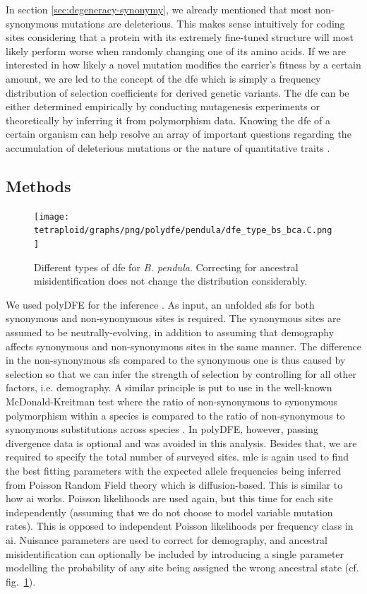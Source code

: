 \documentclass[hidelinks,11pt]{article}
\newcommand{\dadi}{\textdelta a\textdelta i}
\newcommand{\pendula}{\textit{B. pendula}}
\begin{document}
    In section \ref{sec:degeneracy-synonymy}, we already mentioned that most non-synonymous mutations are deleterious. This makes sense intuitively for coding sites considering that a protein with its extremely fine-tuned structure will most likely perform worse when randomly changing one of its amino acids. If we are interested in how likely a novel mutation modifies the carrier's fitness by a certain amount, we are led to the concept of the \acrfull{dfe} which is simply a frequency distribution of selection coefficients for derived genetic variants. The \acrshort{dfe} can be either determined empirically by conducting mutagenesis experiments or theoretically by inferring it from polymorphism data. Knowing the \acrshort{dfe} of a certain organism can help resolve an array of important questions regarding the accumulation of deleterious mutations or the nature of quantitative traits \cite{dfe-review}.

    \subsection{Methods}

    \begin{figure}[ht]
        \centering
        \texttt{[image: tetraploid/graphs/png/polydfe/pendula/dfe\_type\_bs\_bca.C.png]}
        \caption{Different types of \acrshort{dfe} for \pendula{}. Correcting for ancestral misidentification does not change the distribution considerably.}
        \label{fig:dfe_type_C_pendula}
    \end{figure}

    We used polyDFE for the inference \cite{polydfe}. As input, an unfolded \acrshort{sfs} for both synonymous and non-synonymous sites is required. The synonymous sites are assumed to be neutrally-evolving, in addition to assuming that demography affects synonymous and non-synonymous sites in the same manner. The difference in the non-synonymous \acrshort{sfs} compared to the synonymous one is thus caused by selection so that we can infer the strength of selection by controlling for all other factors, i.e. demography. A similar principle is put to use in the well-known McDonald-Kreitman test where the ratio of non-synonymous to synonymous polymorphism within a species is compared to the ratio of non-synonymous to synonymous substitutions across species \cite{mk-test}. In polyDFE, however, passing divergence data is optional and was avoided in this analysis. Besides that, we are required to specify the total number of surveyed sites. \acrfull{mle} is again used to find the best fitting parameters with the expected allele frequencies being inferred from Poisson Random Field theory which is diffusion-based. This is similar to how \dadi{} works. Poisson likelihoods are used again, but this time for each site independently (assuming that we do not choose to model variable mutation rates). This is opposed to independent Poisson likelihoods per frequency class in \dadi{}. Nuisance parameters are used to correct for demography, and ancestral misidentification can optionally be included by introducing a single parameter modelling the probability of any site being assigned the wrong ancestral state (cf. fig.~\ref{fig:dfe_type_C_pendula}).
\end{document}
